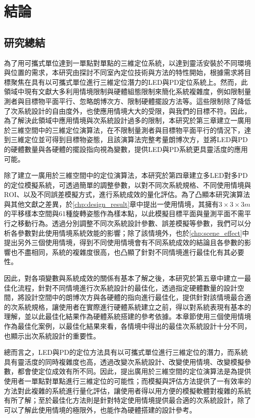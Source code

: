 \chapter{結論}
\label{chp:6}


\section{研究總結}


為了用可攜式單位達到一單點對單點的三維定位系統，以達到靈活安裝於不同環境與位置的需求，本研究由探討不同室內定位技術與方法的特性開始，根據需求將目標聚焦在具有以可攜式單位進行三維定位潛力的LED與PD定位系統上。然而，此領域中現有文獻大多利用情境限制與硬體組態限制來簡化系統複雜度，例如限制量測者與目標物平面平行、忽略朗博次方、限制硬體擺設方法等。這些限制除了降低了次系統設計的自由度外，也使應用情境大大的受限，與我們的目標不符。因此，為了解決此領域中應用情境與次系統設計過多的限制，本研究於第三章建立一廣用於三維空間中的三維定位演算法，在不限制量測者與目標物平面平行的情況下，達到三維定位並可得到目標物姿態，且該演算法完整考量朗博次方，並將LED與PD的硬體數量與各硬體的擺設指向視為變數，提供LED與PD系統更具靈活度的應用可能。

除了建立一廣用於三維空間中的定位演算法，本研究於第四章建立多LED對多PD的定位模擬系統，可透過簡單的調整參數，以對不同次系統規格、不同使用情境與ROI、以及不同誤差模擬方式，進行系統成效的量化評估。為了凸顯本研究演算法與其他文獻之差異，於\ref{chp:design_result}章中提出一使用情境，其擁有$3\times 3\times 3m$的平移樣本空間與61種旋轉姿態作為樣本點，以此模擬目標平面與量測平面不需平行之移動行為。透過分別調整不同次系統設計參數、誤差模擬等參數，我們可以分析各參數對此使用情境系統效能的影響；除了該情境外，也於\ref{chp:scene_effect}中提出另外三個使用情境，得到不同使用情境會有不同系統成效的結論且各參數的影響也不盡相同，系統的複雜度很高，也凸顯了針對不同情境進行最佳化有其必要性。

因此，對各項變數與系統成效的關係有基本了解之後，本研究於第五章中建立一最佳化流程，針對不同情境進行次系統設計的最佳化，透過指定硬體數量的設計空間，將設計空間中的朗博次方與各硬體的指向進行最佳化，提供針對該情境最合適的次系統規格，讓使用者在實際進行硬體系統建立之前，得以對系統表現有基本的理解，並以此最佳化結果作為硬體系統搭建的參考依據。本章節使用三個使用情境作為最佳化案例，以最佳化結果來看，各情境中得出的最佳次系統設計十分不同，也顯示出次系統設計的重要性。

總而言之，LED與PD的定位方法具有以可攜式單位進行三維定位的潛力，而系統具有靈活度的同時複雜度也高，透過改變次系統設計、改變使用情境、改變模擬參數，都會使定位成效有所不同。因此，提出廣用於三維空間的定位演算法是為提供使用者一單點對單點進行三維定位的可能性；而模擬與評估方法提供了一有效率的方法對此複雜的系統進行量化評估，讓使用者得以用方便的模擬軟體對複雜的系統有所了解；至於最佳化方法則是針對特定使用情境提供最合適的次系統設計，除了可以了解此使用情境的極限外，也能作為硬體搭建的設計參考。


